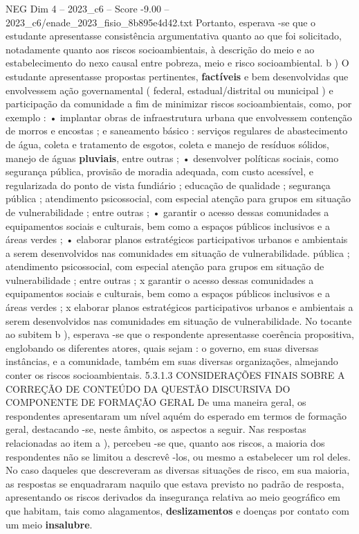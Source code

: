\begin{textsample}{NEG Dim 4 – 2023\_c6 – Score -9.00 – 2023\_c6/enade\_2023\_fisio\_8b895e4d42.txt}
Portanto, esperava -se que o estudante apresentasse consistência argumentativa quanto ao que foi solicitado, notadamente quanto aos riscos socioambientais, à descrição do meio e ao estabelecimento do nexo causal entre pobreza, meio e risco socioambiental. b ) O estudante apresentasse propostas pertinentes, \textbf{factíveis} e bem desenvolvidas que envolvessem ação governamental ( federal, estadual/distrital ou municipal ) e participação da comunidade a fim de minimizar riscos socioambientais, como, por exemplo : • implantar obras de infraestrutura urbana que envolvessem contenção de morros e encostas ; e saneamento básico : serviços regulares de abastecimento de água, coleta e tratamento de esgotos, coleta e manejo de resíduos sólidos, manejo de águas \textbf{pluviais}, entre outras ; • desenvolver políticas sociais, como segurança pública, provisão de moradia adequada, com custo acessível, e regularizada do ponto de vista fundiário ; educação de qualidade ; segurança pública ; atendimento psicossocial, com especial atenção para grupos em situação de vulnerabilidade ; entre outras ; • garantir o acesso dessas comunidades a equipamentos sociais e culturais, bem como a espaços públicos inclusivos e a áreas verdes ; • elaborar planos estratégicos participativos urbanos e ambientais a serem desenvolvidos nas comunidades em situação de vulnerabilidade. pública ; atendimento psicossocial, com especial atenção para grupos em situação de vulnerabilidade ; entre outras ; x garantir o acesso dessas comunidades a equipamentos sociais e culturais, bem como a espaços públicos inclusivos e a áreas verdes ; x elaborar planos estratégicos participativos urbanos e ambientais a serem desenvolvidos nas comunidades em situação de vulnerabilidade.
No tocante ao subitem b ), esperava -se que o respondente apresentasse coerência propositiva, englobando os diferentes atores, quais sejam : o governo, em suas diversas instâncias, e a comunidade, também em suas diversas organizações, almejando conter os riscos socioambientais. 5.3.1.3 CONSIDERAÇÕES FINAIS SOBRE A CORREÇÃO DE CONTEÚDO DA QUESTÃO DISCURSIVA DO COMPONENTE DE FORMAÇÃO GERAL De uma maneira geral, os respondentes apresentaram um nível aquém do esperado em termos de formação geral, destacando -se, neste âmbito, os aspectos a seguir.
Nas respostas relacionadas ao item a ), percebeu -se que, quanto aos riscos, a maioria dos respondentes não se limitou a descrevê -los, ou mesmo a estabelecer um rol deles.
No caso daqueles que descreveram as diversas situações de risco, em sua maioria, as respostas se enquadraram naquilo que estava previsto no padrão de resposta, apresentando os riscos derivados da insegurança relativa ao meio geográfico em que habitam, tais como alagamentos, \textbf{deslizamentos} e doenças por contato com um meio \textbf{insalubre}.

\end{textsample}
